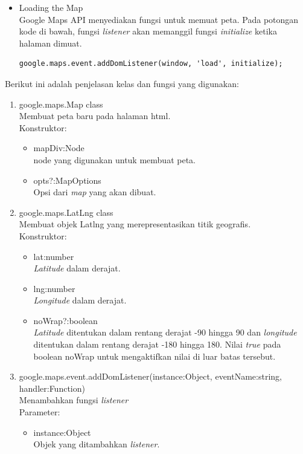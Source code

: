 \begin{itemize}
\item Loading the Map \\
Google Maps API menyediakan fungsi untuk memuat peta. Pada potongan kode
di bawah, fungsi \textit{listener} akan memanggil fungsi \textit{initialize}
ketika halaman dimuat.
\begin{verbatim}
google.maps.event.addDomListener(window, 'load', initialize);
\end{verbatim}
\end{itemize}
Berikut ini adalah penjelasan kelas dan fungsi yang digunakan:
\begin{enumerate}
  \item google.maps.Map class\\
  Membuat peta baru pada halaman html.\\
  Konstruktor:
  \begin{itemize}
    \item mapDiv:Node\\
    node yang digunakan untuk membuat peta.
    
    \item opts?:MapOptions\\
    Opsi dari \textit{map} yang akan dibuat. 
  \end{itemize}
  
  \item google.maps.LatLng class\\
  Membuat objek Latlng yang merepresentasikan titik geografis.\\
  Konstruktor:
  \begin{itemize}
    \item lat:number\\
    \textit{Latitude} dalam derajat.
    
    \item lng:number\\
    \textit{Longitude} dalam derajat.
    
    \item noWrap?:boolean\\
    \textit{Latitude} ditentukan dalam rentang derajat -90 hingga 90 dan
    \textit{longitude} ditentukan dalam rentang derajat -180 hingga 180. Nilai
    \textit{true} pada boolean noWrap untuk mengaktifkan nilai di luar
    batas tersebut.
  \end{itemize}
  
  \item google.maps.event.addDomListener(instance:Object, eventName:string,
  handler:Function)\\
  Menambahkan fungsi \textit{listener}\\
  Parameter:
  \begin{itemize}
    \item instance:Object\\
    Objek yang ditambahkan \textit{listener}.
    

\end{itemize}
\end{enumerate}
